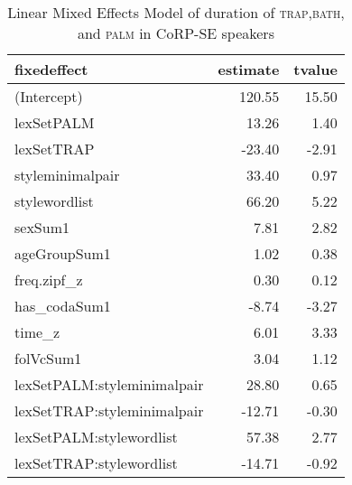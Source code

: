 \begin{table}[ht]
\centering
\begin{tabular}{lrr}
  \hline
fixedeffect & estimate & tvalue \\ 
  \hline
(Intercept) & 120.55 & 15.50 \\ 
  lexSetPALM & 13.26 & 1.40 \\ 
  lexSetTRAP & -23.40 & -2.91 \\ 
  styleminimalpair & 33.40 & 0.97 \\ 
  stylewordlist & 66.20 & 5.22 \\ 
  sexSum1 & 7.81 & 2.82 \\ 
  ageGroupSum1 & 1.02 & 0.38 \\ 
  freq.zipf\_z & 0.30 & 0.12 \\ 
  has\_codaSum1 & -8.74 & -3.27 \\ 
  time\_z & 6.01 & 3.33 \\ 
  folVcSum1 & 3.04 & 1.12 \\ 
  lexSetPALM:styleminimalpair & 28.80 & 0.65 \\ 
  lexSetTRAP:styleminimalpair & -12.71 & -0.30 \\ 
  lexSetPALM:stylewordlist & 57.38 & 2.77 \\ 
  lexSetTRAP:stylewordlist & -14.71 & -0.92 \\ 
   \hline
\end{tabular}
\caption{Linear Mixed Effects Model of duration of \textsc{trap},\textsc{bath}, and \textsc{palm} in CoRP-SE speakers \label{tbl:TBPdurSE}} 
\end{table}
